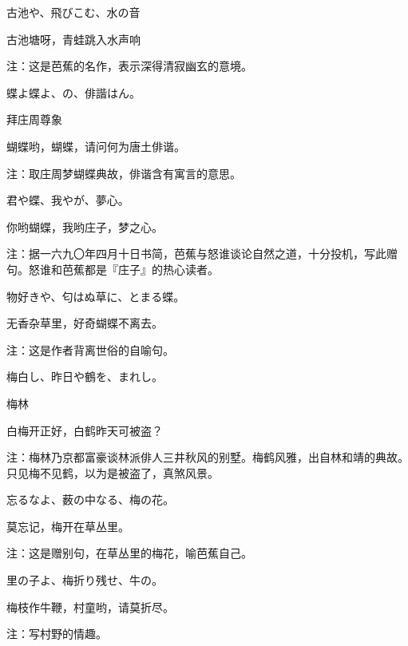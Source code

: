 \begin{haiku}
    {\FH 古池や、飛びこむ、水の音}

    {\FK 古池塘呀，青蛙跳入水声响}

    {\FT 注：这是芭蕉的名作，表示深得清寂幽玄的意境。}
\end{haiku}

\begin{haiku}
    {\FH 蝶よ蝶よ、の、俳諧はん。}

    {\FK 拜庄周尊象}

    {\FK 蝴蝶哟，蝴蝶，请问何为唐土俳谐。}

    {\FT 注：取庄周梦蝴蝶典故，俳谐含有寓言的意思。}
\end{haiku}

\begin{haiku}
    {\FH 君や蝶、我やが、夢心。}

    {\FK 你哟蝴蝶，我哟庄子，梦之心。}

    {\FT 注：据一六九〇年四月十日书简，芭蕉与怒谁谈论自然之道，十分投机，写此赠句。怒谁和芭蕉都是『庄子』的热心读者。}
\end{haiku}

\begin{haiku}
    {\FH 物好きや、匂はぬ草に、とまる蝶。}

    {\FK 无香杂草里，好奇蝴蝶不离去。}

    {\FT 注：这是作者背离世俗的自喻句。}
\end{haiku}

\begin{haiku}
    {\FH 梅白し、昨日や鶴を、まれし。}

    {\FK 梅林}

    {\FK 白梅开正好，白鹤昨天可被盗？}

    {\FT 注：梅林乃京都富豪谈林派俳人三井秋风的别墅。梅鹤风雅，出自林和靖的典故。只见梅不见鹤，以为是被盗了，真煞风景。}
\end{haiku}

\begin{haiku}
    {\FH 忘るなよ、薮の中なる、梅の花。}

    {\FK 莫忘记，梅开在草丛里。}

    {\FT 注：这是赠别句，在草丛里的梅花，喻芭蕉自己。}
\end{haiku}

\begin{haiku}
    {\FH 里の子よ、梅折り残せ、牛の。}

    {\FK 梅枝作牛鞭，村童哟，请莫折尽。}

    {\FT 注：写村野的情趣。}
\end{haiku}


